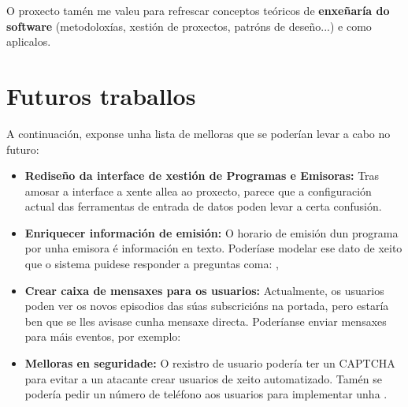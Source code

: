 O proxecto tamén me valeu para refrescar conceptos teóricos de \textbf{enxeñaría do software} (metodoloxías, xestión de proxectos, patróns de deseño...) e como aplicalos.


\section{Futuros traballos}

A continuación, exponse unha lista de melloras que se poderían levar a cabo no futuro:

\begin{itemize}
	
	\item \textbf{Rediseño da interface de xestión de Programas e Emisoras:} Tras amosar a interface a xente allea ao proxecto, parece que a configuración actual das ferramentas de entrada de datos poden levar a certa confusión.
	
	\item \textbf{Enriquecer información de emisión:} O horario de emisión dun programa por unha emisora é información en texto. Poderíase modelar ese dato de xeito que o sistema puidese responder a preguntas coma: , 
	
	\item \textbf{Crear caixa de mensaxes para os usuarios:} Actualmente, os usuarios poden ver os novos episodios das súas subscricións na portada, pero estaría ben que se lles avisase cunha mensaxe directa. Poderíanse enviar mensaxes para máis eventos, por exemplo: 
	
	\item \textbf{Melloras en seguridade:} O rexistro de usuario podería ter un CAPTCHA para evitar a un atacante crear usuarios de xeito automatizado. Tamén se podería pedir un número de teléfono aos usuarios para implementar unha .
\end{itemize}